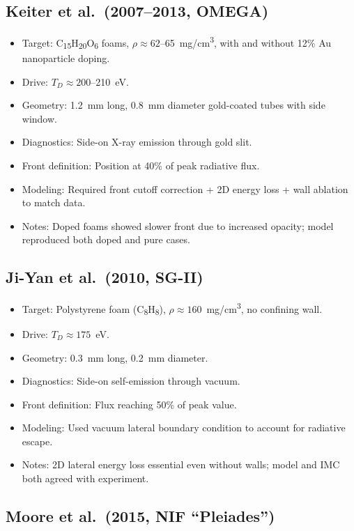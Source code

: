 \documentclass{article}
\begin{document}
\subsection*{Keiter et al.\ (2007–2013, OMEGA)}

\begin{itemize}
    \item Target: C\textsubscript{15}H\textsubscript{20}O\textsubscript{6} foams, $\rho \approx 62$--65~mg/cm\textsuperscript{3}, with and without 12\% Au nanoparticle doping.
    \item Drive: $T_D \approx 200$--210~eV.
    \item Geometry: 1.2~mm long, 0.8~mm diameter gold-coated tubes with side window.
    \item Diagnostics: Side-on X-ray emission through gold slit.
    \item Front definition: Position at 40\% of peak radiative flux.
    \item Modeling: Required front cutoff correction + 2D energy loss + wall ablation to match data.
    \item Notes: Doped foams showed slower front due to increased opacity; model reproduced both doped and pure cases.
\end{itemize}

\subsection*{Ji-Yan et al.\ (2010, SG-II)}

\begin{itemize}
    \item Target: Polystyrene foam (C\textsubscript{8}H\textsubscript{8}), $\rho \approx 160$~mg/cm\textsuperscript{3}, no confining wall.
    \item Drive: $T_D \approx 175$~eV.
    \item Geometry: 0.3~mm long, 0.2~mm diameter.
    \item Diagnostics: Side-on self-emission through vacuum.
    \item Front definition: Flux reaching 50\% of peak value.
    \item Modeling: Used vacuum lateral boundary condition to account for radiative escape.
    \item Notes: 2D lateral energy loss essential even without walls; model and IMC both agreed with experiment.
\end{itemize}

\subsection*{Moore et al.\ (2015, NIF ``Pleiades'')}
\end{document}
